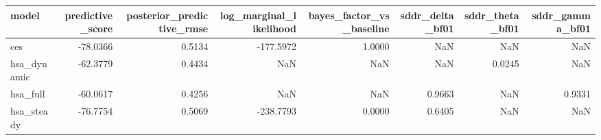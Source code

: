 \begin{tabular}{lrrrrrrr}
\toprule
model & predictive\_score & posterior\_predictive\_rmse & log\_marginal\_likelihood & bayes\_factor\_vs\_baseline & sddr\_delta\_bf01 & sddr\_theta\_bf01 & sddr\_gamma\_bf01 \\
\midrule
ces & -78.0366 & 0.5134 & -177.5972 & 1.0000 & NaN & NaN & NaN \\
hsa\_dynamic & -62.3779 & 0.4434 & NaN & NaN & NaN & 0.0245 & NaN \\
hsa\_full & -60.0617 & 0.4256 & NaN & NaN & 0.9663 & NaN & 0.9331 \\
hsa\_steady & -76.7754 & 0.5069 & -238.7793 & 0.0000 & 0.6405 & NaN & NaN \\
\bottomrule
\end{tabular}
